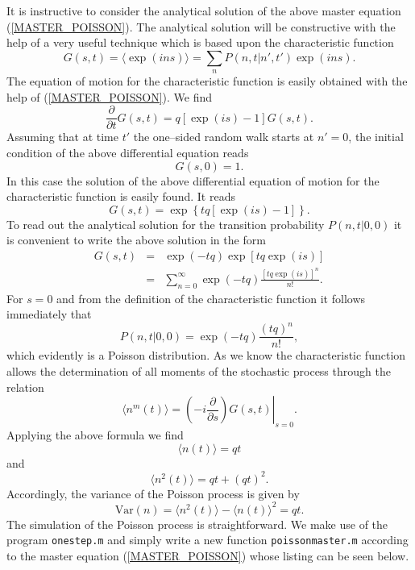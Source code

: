 It is instructive to consider the analytical solution of the 
above master equation (\ref{MASTER_POISSON}). The analytical
solution will be constructive with the help of a very useful 
technique which is based upon the characteristic function
\begin{equation*}
G(s,t) = \langle \exp(ins)\rangle = \sum_n P(n,t|n',t') \exp(ins).
\end{equation*}
The  equation of motion for the characteristic function is easily 
obtained with the help of (\ref{MASTER_POISSON}). We find
\begin{equation*}
\frac{\partial}{\partial t} G(s,t) = 
       q \left[ \exp(is) -1 \right] G(s,t).
\end{equation*}
Assuming that at time $t'$ the one--sided random walk starts at
$n'=0$, the initial condition of the above differential equation
reads
\begin{equation*}
G(s,0) = 1.
\end{equation*}
In this case the solution of the above differential equation of 
motion  for the characteristic function is easily found. It reads
\begin{equation*}
G(s,t) = \exp\left\{ tq \left[ \exp(is)-1 \right]\right\}.
\end{equation*}
To read out the analytical solution for the transition probability
$P(n,t|0,0)$ it is convenient to write the above solution in the
form
\begin{eqnarray*}
G(s,t) &= & \exp(-tq) \exp \left[ tq \exp(is)\right] \\
       &= & \sum_{n=0}^{\infty} \exp(-tq) 
             \frac{[tq\exp(is)]^n}{n!}.
\end{eqnarray*}
For $s=0$ and from the definition of the characteristic function
it follows immediately that
\begin{equation*}
P(n,t|0,0) = \exp(-tq) \frac{(tq)^n}{n!},
\end{equation*}
which evidently is a Poisson distribution. As we know the 
characteristic function allows the determination of all moments of 
the stochastic process through the relation
\begin{equation*}
\langle n^m(t) \rangle = \left. 
       \left( -i \frac{\partial}{\partial s} \right) G(s,t)  
       \right|_{s=0}.
\end{equation*}
Applying the above formula we find
\begin{equation*}
\langle n(t) \rangle = qt
\end{equation*}
and
\begin{equation*}
\langle n^2(t) \rangle = qt + (qt)^2.
\end{equation*}
Accordingly, the variance of the Poisson process is given by
\begin{equation*}
\text{Var}(n) = \langle n^2(t) \rangle - \langle n(t) \rangle^2 = 
   qt.
\end{equation*}
The simulation of the Poisson process is straightforward. We make 
use of the program \texttt{onestep.m} and simply write a new 
function \texttt{poissonmaster.m} according to the 
master equation (\ref{MASTER_POISSON}) whose listing can be
seen below.

